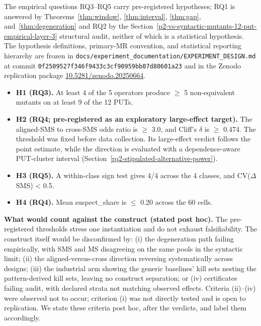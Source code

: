 \documentclass[manuscript,screen,review]{acmart}
\begin{document}
The empirical questions RQ3--RQ5 carry pre-registered hypotheses; RQ1 is
answered by Theorems~\ref{thm:window}, \ref{thm:interval},
\ref{thm:gap}, and~\ref{thm:degeneration} and RQ2 by the Section~\ref{p2-vs-syntactic-mutants-12-put-empirical-layer-3} structural audit, neither of
which is a statistical hypothesis.
The hypothesis definitions, primary-MR convention, and statistical
reporting hierarchy are frozen in
\texttt{docs/experiment\_documentation/EXPERIMENT\_DESIGN.md} at commit
\texttt{0f2509527f346f9433c3cf90959bb07d80601a23} and in the Zenodo
replication package
\href{https://doi.org/10.5281/zenodo.20250664}{10.5281/zenodo.20250664}.

\begin{itemize}

\item
  \textbf{H1 (RQ3).} At least 4 of the 5 operators produce $\geq$ 5 non-equivalent
  mutants on at least 9 of the 12 PUTs.
\item
  \textbf{H2 (RQ4; pre-registered as an exploratory large-effect
  target).} The aligned-SMS to
  cross-SMS odds ratio is $\geq$ 3.0, and Cliff's $\delta$ is $\geq$ 0.474.
  The threshold was fixed before data collection. Its large-effect
  verdict follows the point estimate, while the direction is evaluated
  with a dependence-aware PUT-cluster interval
  (Section~\ref{rq2-stipulated-alternative-power}).
\item
  \textbf{H3 (RQ5).} A within-class sign test gives 4/4 across the 4 classes,
  and CV($\Delta$SMS) \textless{} 0.5.
\item
  \textbf{H4 (RQ4).} Mean suspect\_share is $\leq$ 0.20 across the 60 cells.
\end{itemize}

\textbf{What would count against the construct (stated post hoc).} The
pre-registered thresholds stress one instantiation and do not exhaust
falsifiability. The construct itself would be disconfirmed by: (i) the
degeneration path failing empirically, with SMS and MS disagreeing on
the same pools in the syntactic limit; (ii) the aligned-versus-cross
direction reversing systematically across designs; (iii) the industrial
arm showing the generic baselines' kill sets nesting the pattern-derived
kill sets, leaving no construct separation; or (iv) certificates failing
audit, with declared strata not matching observed effects. Criteria
(ii)--(iv) were observed not to occur; criterion (i) was not directly
tested and is open to replication. We state these criteria post hoc,
after the verdicts, and label them accordingly.
\end{document}
